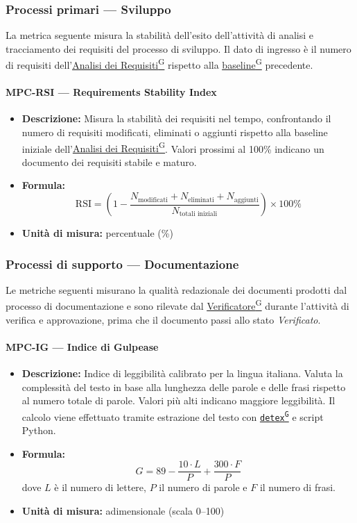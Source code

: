 \documentclass[a4paper,12pt]{article}
\providecommand{\glslink}[2]{\href{https://alittlebyte-19.github.io/Documentazione/glossario.html\#gls-#1}{\underline{#2}\textsuperscript{\scriptsize G}}}
\begin{document}
\subsubsection{Processi primari --- Sviluppo}
La metrica seguente misura la stabilità dell'esito dell'attività di analisi e tracciamento dei requisiti del processo di sviluppo. Il dato di ingresso è il numero di requisiti dell'\glslink{analisi-dei-requisiti-adr}{Analisi dei Requisiti} rispetto alla \glslink{milestone}{baseline} precedente.

\paragraph{MPC-RSI --- Requirements Stability Index}
\begin{itemize}
    \item \textbf{Descrizione:} Misura la stabilità dei requisiti nel tempo, confrontando il numero di requisiti modificati, eliminati o aggiunti rispetto alla baseline iniziale dell'\glslink{analisi-dei-requisiti-adr}{Analisi dei Requisiti}. Valori prossimi al 100\% indicano un documento dei requisiti stabile e maturo.
    \item \textbf{Formula:}
    $$\text{RSI} = \left(1 - \frac{N_{\text{modificati}} + N_{\text{eliminati}} + N_{\text{aggiunti}}}{N_{\text{totali iniziali}}}\right) \times 100\%$$
    \item \textbf{Unità di misura:} percentuale (\%)
\end{itemize}

\subsubsection{Processi di supporto --- Documentazione}
Le metriche seguenti misurano la qualità redazionale dei documenti prodotti dal processo di documentazione e sono rilevate dal \glslink{verificatore}{Verificatore} durante l'attività di verifica e approvazione, prima che il documento passi allo stato \textit{Verificato}.

\paragraph{MPC-IG --- Indice di Gulpease}
\begin{itemize}
    \item \textbf{Descrizione:} Indice di leggibilità calibrato per la lingua italiana. Valuta la complessità del testo in base alla lunghezza delle parole e delle frasi rispetto al numero totale di parole. Valori più alti indicano maggiore leggibilità. Il calcolo viene effettuato tramite estrazione del testo con \texttt{\glslink{detex}{detex}} e script Python.
    \item \textbf{Formula:}
    $$G = 89 - \frac{10 \cdot L}{P} + \frac{300 \cdot F}{P}$$
    dove $L$ è il numero di lettere, $P$ il numero di parole e $F$ il numero di frasi.
    \item \textbf{Unità di misura:} adimensionale (scala 0--100)
\end{itemize}
\end{document}
